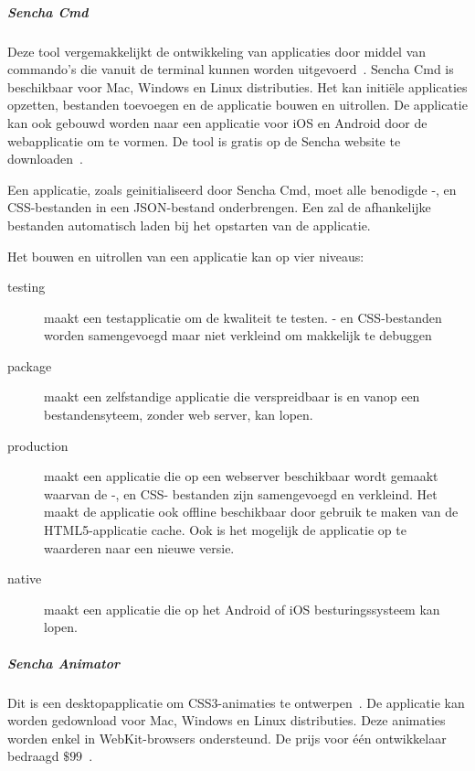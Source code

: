 \subparagraph{Sencha Cmd}
Deze tool vergemakkelijkt de ontwikkeling van \st{} applicaties door middel van commando's die vanuit de terminal kunnen worden uitgevoerd~\cite{Sencha2012}.
Sencha Cmd is beschikbaar voor Mac, Windows en Linux distributies.
Het kan initiële applicaties opzetten,  bestanden toevoegen en de applicatie bouwen en uitrollen.
De applicatie kan ook gebouwd worden naar een  applicatie voor iOS en Android door de webapplicatie om te vormen.
De tool is gratis op de Sencha website te downloaden~\cite{Inc.}.

Een applicatie,  zoals geinitialiseerd door Sencha Cmd,  moet alle benodigde \js-, en CSS-bestanden in een JSON-bestand onderbrengen.
Een  zal de afhankelijke bestanden automatisch laden bij het opstarten van de applicatie.

Het bouwen en uitrollen van een applicatie kan op vier niveaus:
\begin{description}
  \item [testing] maakt een testapplicatie om de kwaliteit te testen.  \js- en CSS-bestanden worden samengevoegd maar niet verkleind om makkelijk te debuggen
  \item [package] maakt een zelfstandige applicatie die verspreidbaar is en vanop een bestandensyteem,  zonder web server,  kan lopen.
  \item [production] maakt een applicatie die op een webserver beschikbaar wordt gemaakt waarvan de \js-, en CSS- bestanden zijn samengevoegd en verkleind.  Het maakt de applicatie ook offline beschikbaar door gebruik te maken van de HTML5-applicatie cache.  Ook is het mogelijk de applicatie op te waarderen naar een nieuwe versie.
  \item [native] maakt een  applicatie die op het Android of iOS besturingssysteem kan lopen.
\end{description}

\subparagraph{Sencha Animator}
Dit is een desktopapplicatie om CSS3-animaties te ontwerpen~\cite{Sencha2012b}.  
De applicatie kan worden gedownload voor Mac, Windows en Linux distributies.
Deze animaties worden enkel in WebKit-browsers ondersteund.
De prijs voor één ontwikkelaar bedraagd $\$99$~\cite{Inc.}.

% 

